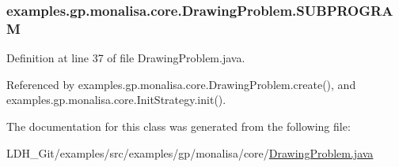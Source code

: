 \hypertarget{classexamples_1_1gp_1_1monalisa_1_1core_1_1_drawing_problem_a3269ac3bd1f2c02ec84f29cda79282c3}{
\subsubsection[{S\-U\-B\-P\-R\-O\-G\-R\-A\-M}]{ examples.\-gp.\-monalisa.\-core.\-Drawing\-Problem.\-S\-U\-B\-P\-R\-O\-G\-R\-A\-M\hspace{0.3cm}{\ttfamily [static]}}}\label{classexamples_1_1gp_1_1monalisa_1_1core_1_1_drawing_problem_a3269ac3bd1f2c02ec84f29cda79282c3}


Definition at line 37 of file Drawing\-Problem.\-java.



Referenced by examples.\-gp.\-monalisa.\-core.\-Drawing\-Problem.\-create(), and examples.\-gp.\-monalisa.\-core.\-Init\-Strategy.\-init().



The documentation for this class was generated from the following file\-:\begin{DoxyCompactItemize}
\item 
L\-D\-H\-\_\-\-Git/examples/src/examples/gp/monalisa/core/\hyperlink{_drawing_problem_8java}{Drawing\-Problem.\-java}\end{DoxyCompactItemize}
